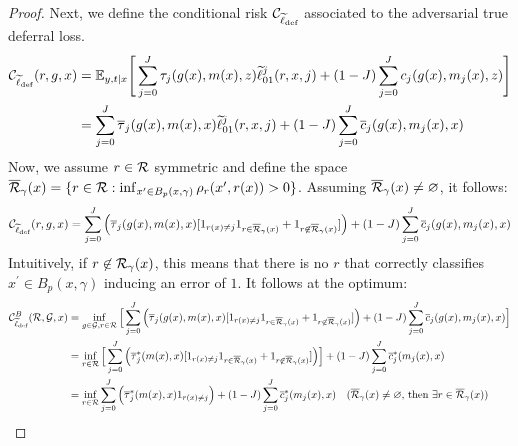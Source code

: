 \begin{appendices}
\begin{proof}
Next, we define the conditional risk $\mathcal{C}_{\widetilde{\ell}_{\text{def}}}$ associated to the adversarial true deferral loss. 
\begin{equation}
    \begin{aligned}
        \mathcal{C}_{\widetilde{\ell}_{\text{def}}}(r,g,x) & =  \mathbb{E}_{y,t|x}\Bigg[ \sum_{j=0}^J \tau_j(g(x),m(x),z)\widetilde{\ell}_{01}^j(r,x,j) + (1-J)\sum_{j=0}^J c_j(g(x),m_j(x),z) \Bigg] \\
        & = \sum_{j=0}^J \overline{\tau}_j(g(x),m(x),x)\widetilde{\ell}_{01}^j(r,x,j) + (1-J)\sum_{j=0}^J \overline{c}_j(g(x), m_j(x),x)
    \end{aligned}
\end{equation}
Now, we assume $r\in\mathcal{R}$ symmetric and define the space $\overline{\mathcal{R}}_{\gamma}(x) = \{r\in\mathcal{R}: \inf_{x^\prime \in B_p(x,\gamma)}\rho_r(x^\prime, r(x))>0\}$. Assuming $\overline{\mathcal{R}}_{\gamma}(x) \not= \varnothing$, it follows:
\begin{equation}
   \mathcal{C}_{\widetilde{\ell}_{\text{def}}}(r,g,x) = \sum_{j=0}^J \Big(\overline{\tau}_j(g(x),m(x),x)[1_{r(x)\not=j}1_{r\in\overline{\mathcal{R}}_{\gamma}(x)} + 1_{r\not\in\overline{\mathcal{R}}_{\gamma}(x)}]\Big) + (1-J)\sum_{j=0}^J \overline{c}_j(g(x), m_j(x),x)
\end{equation}
Intuitively, if $r\not\in\mathcal{R}_{\gamma}(x)$, this means that there is no $r$ that correctly classifies $x^\prime\in B_p(x,\gamma)$ inducing an error of $1$. It follows at the optimum:    
\begin{equation}\label{eq:conditional}
    \begin{aligned}
        \mc{C}_{\widetilde{\ell}_{\text{def}}}^B(\mc{R}, \mc{G},x) & = \inf_{g\in\mc{G},r\in\mc{R}}\Big[\sum_{j=0}^J \Big(\overline{\tau}_j(g(x),m(x),x)[1_{r(x)\not=j}1_{r\in\overline{\mc{R}}_{\gamma}(x)} + 1_{r\not\in\overline{\mc{R}}_{\gamma}(x)}]\Big) + (1-J)\sum_{j=0}^J \overline{c}_j(g(x), m_j(x),x)\Big] \\
        & = \inf_{r\in\mc{R}}\Big[\sum_{j=0}^J \Big(\overline{\tau}_j^\ast(m(x),x)[1_{r(x)\not=j}1_{r\in\overline{\mc{R}}_{\gamma}(x)} + 1_{r\not\in\overline{\mc{R}}_{\gamma}(x)}]\Big)\Big] + (1-J)\sum_{j=0}^J \overline{c}^\ast_j(m_j(x),x)\\
        & =  \inf_{r\in\mc{R}}\sum_{j=0}^J \Big(\overline{\tau}_j^\ast(m(x),x)1_{r(x)\not=j}\Big) + (1-J)\sum_{j=0}^J \overline{c}^\ast_j(m_j(x),x)  \quad \text{($\overline{\mc{R}}_{\gamma}(x)\not=\varnothing$, then $\exists r \in \overline{\mc{R}}_{\gamma}(x)$)} \\

\end{aligned}
\end{equation}
\end{proof}
\end{appendices}
